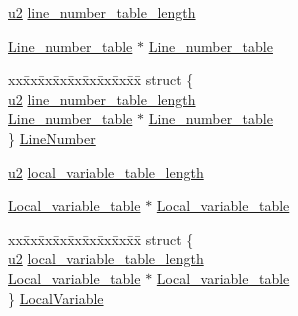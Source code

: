 \begin{DoxyCompactItemize}
\begin{tabbing}
\end{tabbing}\item 
\hyperlink{macros_8h_aa76d8c8015643c6a837661a10142016e}{u2} \hyperlink{structattribute__info_ac5528d280b9c73aee17902c9e7e70825}{line\+\_\+number\+\_\+table\+\_\+length}
\item 
\hyperlink{struct_line__number__table}{Line\+\_\+number\+\_\+table} $\ast$ \hyperlink{structattribute__info_ad9e40bbab2adac164804e827e0e81cb4}{Line\+\_\+number\+\_\+table}
\item 
\begin{tabbing}
xx\=xx\=xx\=xx\=xx\=xx\=xx\=xx\=xx\=\kill
struct \{\\
\>\hyperlink{macros_8h_aa76d8c8015643c6a837661a10142016e}{u2} \hyperlink{structattribute__info_ac5528d280b9c73aee17902c9e7e70825}{line\_number\_table\_length}\\
\>\hyperlink{struct_line__number__table}{Line\_number\_table} $\ast$ \hyperlink{structattribute__info_ad9e40bbab2adac164804e827e0e81cb4}{Line\_number\_table}\\
\} \hyperlink{structattribute__info_ae7f32eb2f7dd3058a50f9cf7fcb7dfa5}{LineNumber}\\

\end{tabbing}\item 
\hyperlink{macros_8h_aa76d8c8015643c6a837661a10142016e}{u2} \hyperlink{structattribute__info_a85a1f4ca89adb06ef50cc832cfe7b901}{local\+\_\+variable\+\_\+table\+\_\+length}
\item 
\hyperlink{struct_local__variable__table}{Local\+\_\+variable\+\_\+table} $\ast$ \hyperlink{structattribute__info_a330b7ebc1249b0287d7166399c35e2ff}{Local\+\_\+variable\+\_\+table}
\item 
\begin{tabbing}
xx\=xx\=xx\=xx\=xx\=xx\=xx\=xx\=xx\=\kill
struct \{\\
\>\hyperlink{macros_8h_aa76d8c8015643c6a837661a10142016e}{u2} \hyperlink{structattribute__info_a85a1f4ca89adb06ef50cc832cfe7b901}{local\_variable\_table\_length}\\
\>\hyperlink{struct_local__variable__table}{Local\_variable\_table} $\ast$ \hyperlink{structattribute__info_a330b7ebc1249b0287d7166399c35e2ff}{Local\_variable\_table}\\
\} \hyperlink{structattribute__info_af6a9807c54c23da81d9d72a30a856880}{LocalVariable}\\


\end{tabbing}
\end{DoxyCompactItemize}
